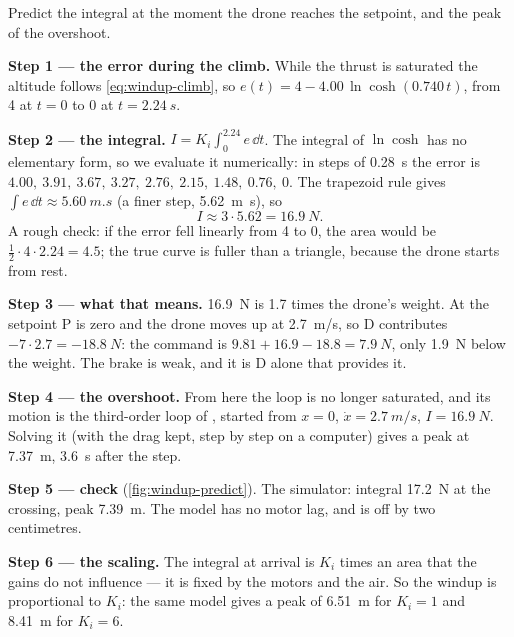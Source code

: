 \begin{example}
\label{ex:windup-size}
Predict the integral at the moment the drone reaches the setpoint, and the peak of the overshoot.

\textbf{Step 1 — the error during the climb.} While the thrust is saturated the altitude follows \cref{eq:windup-climb}, so $e(t) = 4 - 4.00\,\ln\cosh(0.740\,t)$, from 4 at $t = 0$ to 0 at $t = \SI{2.24}{s}$.

\textbf{Step 2 — the integral.} $I = K_i\int_0^{2.24} e\,\dd t$. The integral of $\ln\cosh$ has no elementary form, so we evaluate it numerically: in steps of \SI{0.28}{s} the error is $4.00,\ 3.91,\ 3.67,\ 3.27,\ 2.76,\ 2.15,\ 1.48,\ 0.76,\ 0$. The trapezoid rule gives $\int e\,\dd t \approx \SI{5.60}{m.s}$ (a finer step, \SI{5.62}{m.s}), so
\begin{equation*}
  I \approx 3 \cdot 5.62 = \SI{16.9}{N}.
\end{equation*}
A rough check: if the error fell linearly from 4 to 0, the area would be $\tfrac12 \cdot 4 \cdot 2.24 = 4.5$; the true curve is fuller than a triangle, because the drone starts from rest.

\textbf{Step 3 — what that means.} \SI{16.9}{N} is 1.7 times the drone's weight. At the setpoint P is zero and the drone moves up at \SI{2.7}{m/s}, so D contributes $-7 \cdot 2.7 = \SI{-18.8}{N}$: the command is $9.81 + 16.9 - 18.8 = \SI{7.9}{N}$, only \SI{1.9}{N} below the weight. The brake is weak, and it is D alone that provides it.

\textbf{Step 4 — the overshoot.} From here the loop is no longer saturated, and its motion is the third-order loop of , started from $x = 0$, $\dot x = \SI{2.7}{m/s}$, $I = \SI{16.9}{N}$. Solving it (with the drag kept, step by step on a computer) gives a peak at \SI{7.37}{m}, \SI{3.6}{s} after the step.

\textbf{Step 5 — check} (\cref{fig:windup-predict}). The simulator: integral \SI{17.2}{N} at the crossing, peak \SI{7.39}{m}. The model has no motor lag, and is off by two centimetres.

\textbf{Step 6 — the scaling.} The integral at arrival is $K_i$ times an area that the gains do not influence — it is fixed by the motors and the air. So the windup is proportional to $K_i$: the same model gives a peak of \SI{6.51}{m} for $K_i = 1$ and \SI{8.41}{m} for $K_i = 6$.
\end{example}


